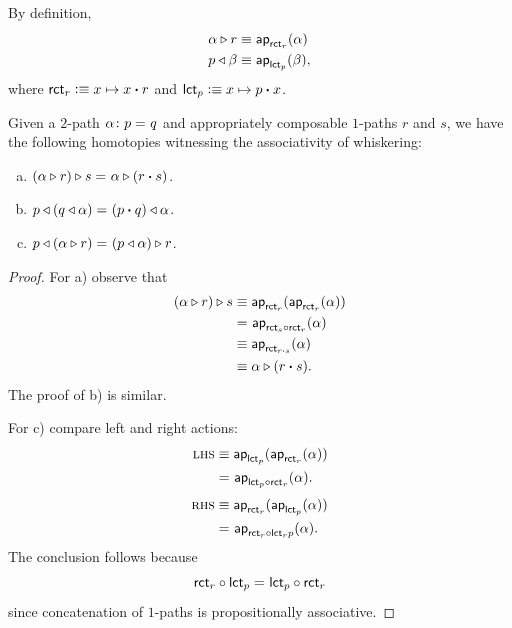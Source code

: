 \begin{rem}\label{rem:path-whiskering-defn}
    By definition,
    \begin{align*}
        \alpha\triangleright r&\equiv\mathsf{ap}_{\mathsf{rct}_r}(\alpha)\\
        p\triangleleft\beta&\equiv\mathsf{ap}_{\mathsf{lct}_p}(\beta),
    \end{align*}
    where $\mathsf{rct}_r\mathrel{\vcentcolon}\equiv x\mapsto x\mathbin{\boldsymbol{\cdot}} r$ and $\mathsf{lct}_p\mathrel{\vcentcolon}\equiv x\mapsto p\mathbin{\boldsymbol{\cdot}} x$.
\end{rem}

\begin{prop}\label{prop:path-whiskering-associativity}
    Given a $2$-path\/ $\alpha\colon p\eq{}q$ and appropriately composable $1$-paths\/ $r$ and\/ $s$, we have the following homotopies witnessing the associativity of whiskering:
    \begin{enumerate}[a),font=\upshape]
        \item $(\alpha\triangleright r)\triangleright s\mathrel{=_{}}\alpha\triangleright(r\mathbin{\boldsymbol{\cdot}} s)$.
        \item $p\triangleleft(q \triangleleft\alpha)\mathrel{=_{}}(p\mathbin{\boldsymbol{\cdot}} q)\triangleleft\alpha$.
        \item $p\triangleleft(\alpha\triangleright r)\mathrel{=_{}}(p\triangleleft\alpha)\triangleright r$.
    \end{enumerate}
\end{prop}

\begin{proof}    
    For a) observe that
    \begin{align*}
        (\alpha\triangleright r)\triangleright s
            &\equiv\mathsf{ap}_{\mathsf{rct}_r}
                (\mathsf{ap}_{\mathsf{rct}_r}(\alpha))\\
            &\mathrel{=_{}}\mathsf{ap}_{\mathsf{rct}_s\circ\mathsf{rct}_r}(\alpha)\\
            &\equiv\mathsf{ap}_{\mathsf{rct}_{r\mathbin{\boldsymbol{\cdot}} s}}(\alpha)\\
            &\equiv\alpha\triangleright(r\mathbin{\boldsymbol{\cdot}} s).
    \end{align*}
    The proof of b) is similar.
    
    For c) compare left and right actions:
    \begin{align*}
        \textsc{lhs}&\equiv
            \mathsf{ap}_{\mathsf{lct}_p}
                (\mathsf{ap}_{\mathsf{rct}_r}(\alpha))\\
            &\mathrel{=_{}}\mathsf{ap}_{\mathsf{lct}_p\circ\mathsf{rct}_r}(\alpha).\\[1mm]
        \textsc{rhs}&\equiv
            \mathsf{ap}_{\mathsf{rct}_r}(\mathsf{ap}_{\mathsf{lct}_p}
                (\alpha))\\
            &\mathrel{=_{}}\mathsf{ap}_{\mathsf{rct}_r\circ\mathsf{lct}_rp}
                (\alpha).
    \end{align*}
    The conclusion follows because
    \[
        \mathsf{rct}_r\circ\mathsf{lct}_p
            \mathrel{=_{}}\mathsf{lct}_p\circ\mathsf{rct}_r
    \]
    since concatenation of $1$-paths is propositionally associative.
\end{proof}


